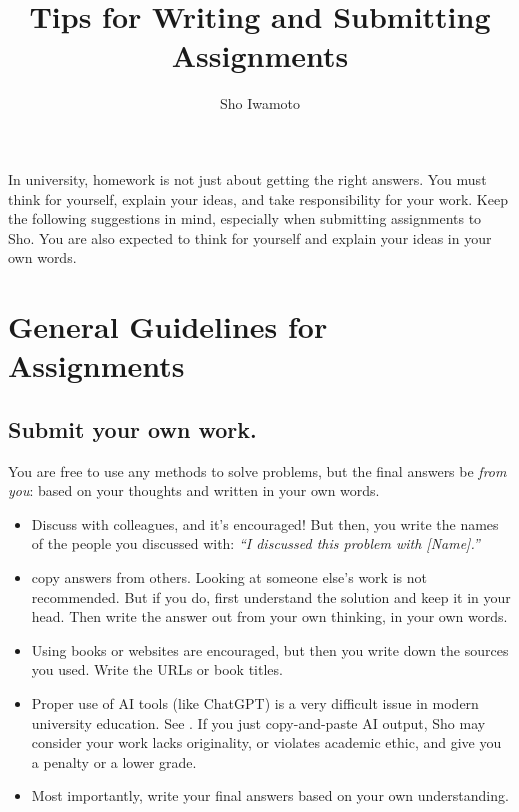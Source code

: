 \documentclass[11pt,pdfa,lastpage,minititle]{MishoNote}
\title{Tips for Writing and Submitting Assignments}
\author{Sho Iwamoto}
\begin{document}
\maketitle

In university, homework is not just about getting the right answers.
You must think for yourself, explain your ideas, and take responsibility for your work.
Keep the following suggestions in mind, especially when submitting assignments to Sho.
You are also expected to think for yourself and explain your ideas in your own words.



\section*{General Guidelines for Assignments}
\subsection{Submit your own work.}

You are free to use any methods to solve problems, but the final answers  be \emph{from you}: based on your thoughts and written in your own words.
\begin{itemize}
  \item Discuss with colleagues, and it's encouraged! But then, you  write the names of the people you discussed with: \emph{``I discussed this problem with [Name].''}
  \item {} copy answers from others. Looking at someone else's work is not recommended. But if you do, first understand the solution and keep it in your head. Then write the answer out from your own thinking, in your own words.
  \item Using books or websites are encouraged, but then you  write down the sources you used. Write the URLs or book titles.
  \item Proper use of AI tools (like ChatGPT) is a very difficult issue in modern university education. See .
  If you just copy-and-paste AI output, Sho may consider your work lacks originality, or violates academic ethic, and give you a penalty or a lower grade.
  \item Most importantly, write your final answers based on your own understanding.
\end{itemize}
\OutputNote
\end{document}
